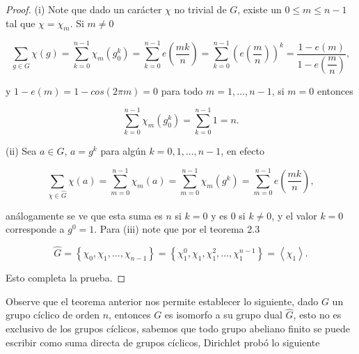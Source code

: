 \begin{proof}
(i) Note que dado un carácter $\chi$ no trivial de $G$, existe un $0\leq m\leq n-1$ tal que $\chi=\chi_m$. Si $m\neq 0$

$$\sum_{g \in G} \chi(g)=\sum_{k=0}^{n-1} \chi_m\left(g_0^k\right)=\sum_{k=0}^{n-1} e\left(\frac{m k}{n}\right)=\sum_{k=0}^{n-1}\left(e\left(\frac{m}{n}\right)\right)^k=\dfrac{1-e(m)}{1-e\left(\dfrac{m}{n}\right)},$$

y $1-e(m)=1-cos(2\pi m)=0$ para todo $m=1,\ldots,n-1$, si $m=0$ entonces

$$\sum_{k=0}^{n-1} \chi_m\left(g_0^k\right)=\sum_{k=0}^{n-1} 1=n.$$

(ii) Sea $a\in G$, $a=g^{k}$ para algún $k=0,1,\ldots,n-1$, en efecto

$$\sum_{\chi \in \widehat{G}} \chi(a)=\sum_{m=0}^{n-1} \chi_m(a)=\sum_{m=0}^{n-1} \chi_m\left(g^k\right)=\sum_{m=0}^{n-1} e\left(\frac{m k}{n}\right),$$

análogamente se ve que esta suma es $n$ si $k=0$ y es 0 si $k\neq 0$, y el valor $k=0$ corresponde a $g^{0}=1$. Para (iii) note que por el teorema 2.3

$$\widehat{G}=\left\{\chi_0, \chi_1, \ldots, \chi_{n-1}\right\}=\left\{\chi_1^0, \chi_1, \chi_1^2, \ldots, \chi_1^{n-1}\right\}=\left\langle\chi_1\right\rangle.$$

Esto completa la prueba.

\end{proof}

Observe que el teorema anterior nos permite establecer lo siguiente, dado $G$ un grupo cíclico de orden $n$, entonces $G$ es isomorfo a su grupo dual $\widehat{G}$, esto no es exclusivo de los grupos cíclicos, sabemos que todo grupo abeliano finito se puede escribir como suma directa de grupos cíclicos, Dirichlet probó lo siguiente

